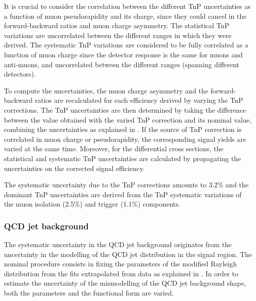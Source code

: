 It is crucial to consider the correlation between the different TnP uncertainties as a function of muon pseudorapidity and its charge, since they could cancel in the forward-backward ratios and muon charge asymmetry. The statistical TnP variations are uncorrelated between the different \etaLAB ranges in which they were derived. The systematic TnP variations are considered to be fully correlated as a function of muon charge since the detector response is the same for muons and anti-muons, and uncorrelated between the different \etaCM ranges (spanning different detectors).

To compute the uncertainties, the muon charge asymmetry and the forward-backward ratios are recalculated for each efficiency derived by varying the TnP corrections. The TnP uncertainties are then determined by taking the difference between the value obtained with the varied TnP correction and its nominal value, combining the uncertainties as explained in . If the source of TnP correction is correlated in muon charge or pseudorapidity, the corresponding signal yields are varied at the same time. Moreover, for the \Wpm differential cross sections, the statistical and systematic TnP uncertainties are calculated by propagating the uncertainties on the corrected signal efficiency.

The systematic uncertainty due to the TnP corrections amounts to 3.2\% and the dominant TnP uncertainties  are derived from the TnP systematic variations of the muon isolation (2.5\%) and trigger (1.1\%) components.

\subsubsection{QCD jet background}

The systematic uncertainty in the QCD jet background originates from the uncertainty in the modelling of the QCD jet \ptmiss distribution in the signal region. The nominal procedure consists in fixing the parameters of the modified Rayleigh distribution from the fits extrapolated from data as explained in . In order to estimate the uncertainty of the mismodelling of the QCD jet background shape, both the parameters and the functional form are varied.

